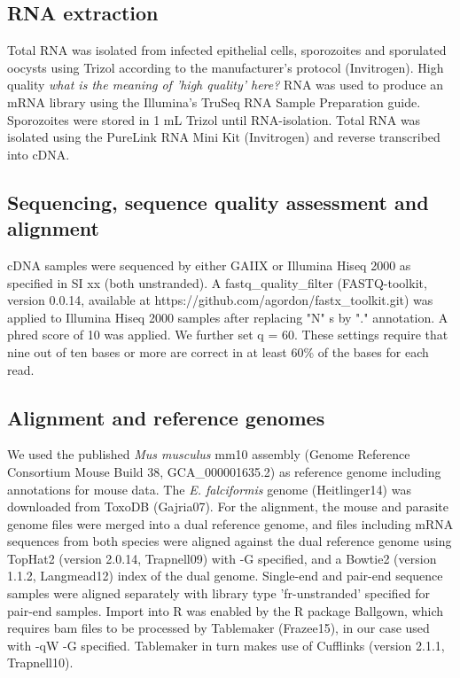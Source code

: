 \documentclass{bmcart}
\begin{document}
\subsection*{RNA extraction}
Total RNA was isolated from infected epithelial cells, sporozoites and
sporulated oocysts using Trizol according to the manufacturer’s
protocol (Invitrogen). High quality \emph{what is the meaning of 'high
  quality' here?}  RNA was used to produce an mRNA library using the
Illumina’s TruSeq RNA Sample Preparation guide. Sporozoites were stored in 1 mL Trizol until
RNA-isolation. Total RNA was isolated using the PureLink RNA Mini Kit
(Invitrogen) and reverse transcribed into cDNA.

\subsection*{Sequencing, sequence quality assessment and alignment}
cDNA samples were sequenced by either GAIIX or Illumina Hiseq 2000 as
specified in SI xx (both unstranded). A fastq\_quality\_filter
(FASTQ-toolkit, version 0.0.14, available at
https://github.com/agordon/fastx\_toolkit.git) was applied to Illumina
Hiseq 2000 samples after replacing "N" s by "." annotation.  A
phred score of 10 was applied. We further set q = 60. These settings
require that nine out of ten bases or more are correct in at least
60\% of the bases for each read.

\subsection*{Alignment and reference genomes}
We used the published \textit{Mus musculus} mm10 assembly (Genome
Reference Consortium Mouse Build 38, GCA\_000001635.2) as reference
genome including annotations for mouse data. The
\textit{E. falciformis} genome (Heitlinger14) was downloaded from
ToxoDB (Gajria07). For the alignment, the mouse and parasite genome
files were merged into a dual reference genome, and files including
mRNA sequences from both species were aligned against the dual
reference genome using TopHat2 (version 2.0.14, Trapnell09) with -G
specified, and a Bowtie2 (version 1.1.2, Langmead12) index of the dual
genome. Single-end and pair-end sequence samples were aligned
separately with library type 'fr-unstranded' specified for pair-end
samples. Import into R was enabled by the R package Ballgown, which
requires bam files to be processed by Tablemaker (Frazee15), in our
case used with -qW -G specified. Tablemaker in turn makes use of
Cufflinks (version 2.1.1, Trapnell10).
\end{document}
